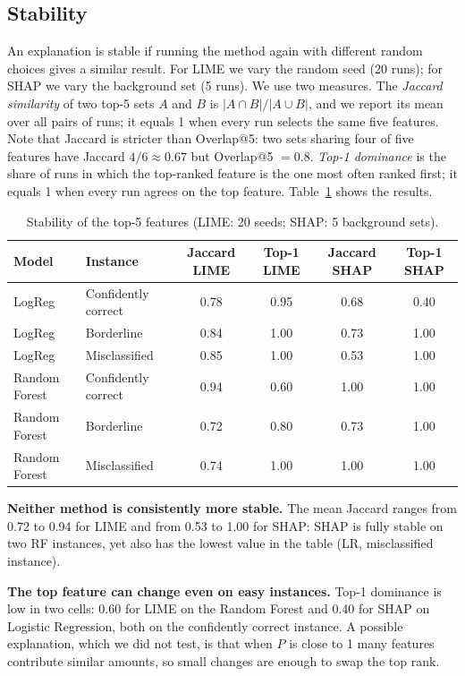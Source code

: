\documentclass[11pt,a4paper]{article}
\begin{document}
\subsection{Stability}
\label{sec:stability}
An explanation is stable if running the method again with different random
choices gives a similar result. For LIME we vary the random seed (20 runs);
for SHAP we vary the background set (5 runs). We use two measures. The
\emph{Jaccard similarity} of two top-5 sets $A$ and $B$ is
$|A \cap B| / |A \cup B|$, and we report its mean over all pairs of runs; it
equals 1 when every run selects the same five features. Note that Jaccard is
stricter than Overlap@5: two sets sharing four of five features have Jaccard
$4/6 \approx 0.67$ but Overlap@5 $= 0.8$. \emph{Top-1 dominance} is the share
of runs in which the top-ranked feature is the one most often ranked first;
it equals 1 when every run agrees on the top feature.
Table~\ref{tab:stability} shows the results.

\begin{table}[!htb]
\centering\small
\caption{Stability of the top-5 features (LIME: 20 seeds; SHAP: 5 background sets).}\label{tab:stability}
\setlength{\tabcolsep}{4pt}
\begin{tabular}{llcccc}
\toprule
\textbf{Model} & \textbf{Instance} & \textbf{Jaccard LIME} & \textbf{Top-1 LIME} & \textbf{Jaccard SHAP} & \textbf{Top-1 SHAP}\\
\midrule
LogReg & Confidently correct & 0.78 & 0.95 & 0.68 & 0.40\\
LogReg & Borderline & 0.84 & 1.00 & 0.73 & 1.00\\
LogReg & Misclassified & 0.85 & 1.00 & 0.53 & 1.00\\
Random Forest & Confidently correct & 0.94 & 0.60 & 1.00 & 1.00\\
Random Forest & Borderline & 0.72 & 0.80 & 0.73 & 1.00\\
Random Forest & Misclassified & 0.74 & 1.00 & 1.00 & 1.00\\
\bottomrule
\end{tabular}
\end{table}

\textbf{Neither method is consistently more stable.} The mean Jaccard ranges
from 0.72 to 0.94 for LIME and from 0.53 to 1.00 for SHAP: SHAP is fully
stable on two RF instances, yet also has the lowest value in the table (LR,
misclassified instance).

\textbf{The top feature can change even on easy instances.} Top-1 dominance is
low in two cells: 0.60 for LIME on the Random Forest and 0.40 for SHAP on
Logistic Regression, both on the confidently correct instance. A possible
explanation, which we did not test, is that when $P$ is close to 1 many
features contribute similar amounts, so small changes are enough to swap the
top rank.
\end{document}
